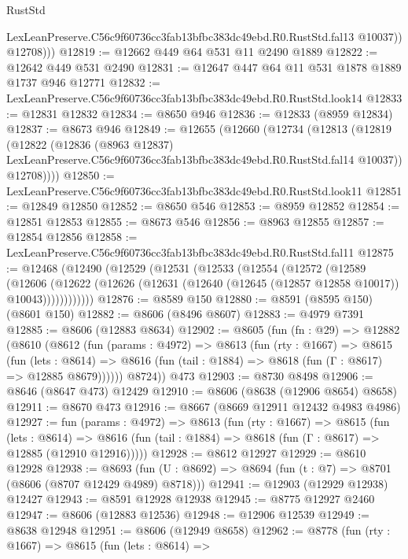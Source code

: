 \begin{lexlean}{RustStd}
\begin{coremodule}
              LexLeanPreserve.C56c9f60736cc3fab13bfbc383dc49ebd.R0.RustStd.fal13
              @10037))
          @12708)))
@12819 := @12662 @449 @64 @531 @11 @2490 @1889
@12822 := @12642 @449 @531 @2490
@12831 := @12647 @447 @64 @11 @531 @1878 @1889 @1737 @946 @12771
@12832 := LexLeanPreserve.C56c9f60736cc3fab13bfbc383dc49ebd.R0.RustStd.look14
@12833 := @12831 @12832
@12834 := @8650 @946
@12836 := @12833 (@8959 @12834)
@12837 := @8673 @946
@12849 := @12655
    (@12660
      (@12734
        (@12813
          (@12819
            (@12822
              (@12836
                (@8963 @12837)
                LexLeanPreserve.C56c9f60736cc3fab13bfbc383dc49ebd.R0.RustStd.fal14
                @10037))
            @12708))))
@12850 := LexLeanPreserve.C56c9f60736cc3fab13bfbc383dc49ebd.R0.RustStd.look11
@12851 := @12849 @12850
@12852 := @8650 @546
@12853 := @8959 @12852
@12854 := @12851 @12853
@12855 := @8673 @546
@12856 := @8963 @12855
@12857 := @12854 @12856
@12858 := LexLeanPreserve.C56c9f60736cc3fab13bfbc383dc49ebd.R0.RustStd.fal11
@12875 := @12468
    (@12490
      (@12529
        (@12531
          (@12533
            (@12554
              (@12572
                (@12589
                  (@12606
                    (@12622
                      (@12626 (@12631 (@12640 (@12645 (@12857 @12858 @10017)) @10043))))))))))))
@12876 := @8589 @150
@12880 := @8591 (@8595 @150) (@8601 @150)
@12882 := @8606 (@8496 @8607)
@12883 := @4979 @7391
@12885 := @8606 (@12883 @8634)
@12902 := @8605
    (fun (fn : @29) =>
    @12882
      (@8610
        (@8612
          (fun (params : @4972) =>
          @8613
            (fun (rty : @1667) =>
            @8615
              (fun (lets : @8614) =>
              @8616 (fun (tail : @1884) => @8618 (fun (Γ : @8617) => @12885 @8679))))))
        @8724))
    @473
@12903 := @8730 @8498
@12906 := @8646 (@8647 @473) @12429
@12910 := @8606 (@8638 (@12906 @8654) @8658)
@12911 := @8670 @473
@12916 := @8667 (@8669 @12911 @12432 @4983 @4986)
@12927 := fun (params : @4972) =>
  @8613
    (fun (rty : @1667) =>
    @8615
      (fun (lets : @8614) =>
      @8616 (fun (tail : @1884) => @8618 (fun (Γ : @8617) => @12885 (@12910 @12916)))))
@12928 := @8612 @12927
@12929 := @8610 @12928
@12938 := @8693
    (fun (U : @8692) => @8694 (fun (t : @7) => @8701 (@8606 (@8707 @12429 @4989) @8718)))
@12941 := @12903 (@12929 @12938) @12427
@12943 := @8591 @12928 @12938
@12945 := @8775 @12927 @2460
@12947 := @8606 (@12883 @12536)
@12948 := @12906 @12539
@12949 := @8638 @12948
@12951 := @8606 (@12949 @8658)
@12962 := @8778
    (fun (rty : @1667) =>
    @8615
      (fun (lets : @8614) =>

\end{coremodule}
\end{lexlean}
